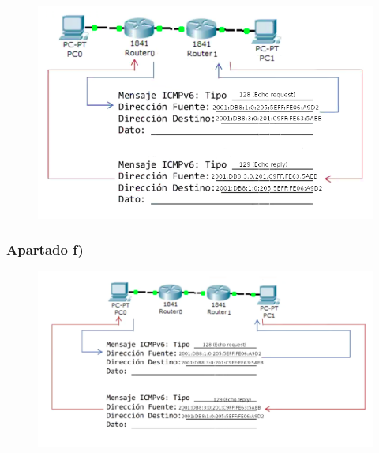 \documentclass[11pt]{article}
\begin{document}
\begin{figure}[h!]
  \begin{center}
    \includegraphics[width=0.95\linewidth]{4d.png}
  \end{center}
\end{figure}

\subsubsection*{Apartado f)}

\begin{figure}[h!]
  \begin{center}
    \includegraphics[width=0.95\linewidth]{4f.png}
  \end{center}
\end{figure}
\end{document}
